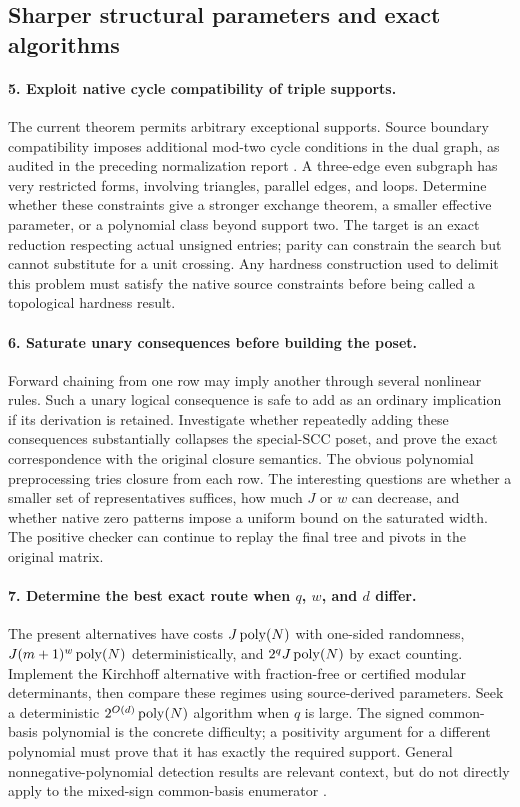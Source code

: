 \subsection{Sharper structural parameters and exact algorithms}

\paragraph{5. Exploit native cycle compatibility of triple supports.}
The current theorem permits arbitrary exceptional supports.  Source
boundary compatibility imposes additional mod-two cycle conditions in the
dual graph, as audited in the preceding normalization report
\cite{IncomingForests2026}.  A three-edge even subgraph has very restricted
forms, involving triangles, parallel edges, and loops.  Determine whether
these constraints give a stronger exchange theorem, a smaller effective
parameter, or a polynomial class beyond support two.  The target is an
exact reduction respecting actual unsigned entries; parity can constrain
the search but cannot substitute for a unit crossing.  Any hardness
construction used to delimit this problem must satisfy the native source
constraints before being called a topological hardness result.

\paragraph{6. Saturate unary consequences before building the poset.}
Forward chaining from one row may imply another through several nonlinear
rules.  Such a unary logical consequence is safe to add as an ordinary
implication if its derivation is retained.  Investigate whether repeatedly
adding these consequences substantially collapses the special-SCC poset,
and prove the exact correspondence with the original closure semantics.
The obvious polynomial preprocessing tries closure from each row.  The
interesting questions are whether a smaller set of representatives suffices,
how much $J$ or $w$ can decrease, and whether native zero patterns impose
a uniform bound on the saturated width.  The positive checker can continue
to replay the final tree and pivots in the original matrix.

\paragraph{7. Determine the best exact route when $q$, $w$, and $d$ differ.}
The present alternatives have costs $J\operatorname{poly}(N)$ with one-sided randomness,
$J(m+1)^w\operatorname{poly}(N)$ deterministically, and $2^qJ\operatorname{poly}(N)$ by exact counting.
Implement the Kirchhoff alternative with fraction-free or certified modular
determinants, then compare these regimes using source-derived parameters.
Seek a deterministic $2^{O(d)}\operatorname{poly}(N)$ algorithm when $q$ is large.
The signed common-basis polynomial is the concrete difficulty; a positivity
argument for a different polynomial must prove that it has exactly the
required support.  General nonnegative-polynomial detection results are
relevant context, but do not directly apply to the mixed-sign common-basis
enumerator \cite{BrandKorchemnaSkotnica2023}.

